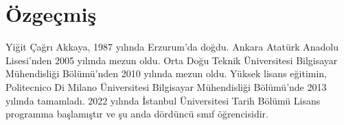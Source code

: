 \section*{Özgeçmiş}
Yiğit Çağrı Akkaya, 1987 yılında Erzurum'da doğdu. Ankara Atatürk Anadolu Lisesi'nden 2005 yılında mezun oldu. Orta Doğu Teknik Üniversitesi Bilgisayar Mühendisliği Bölümü'nden 2010 yılında mezun oldu.
Yüksek lisans eğitimin, Politecnico Di Milano Üniversitesi Bilgisayar Mühendisliği Bölümü'nde 2013 yılında tamamladı. 2022 yılında İstanbul Üniversitesi Tarih Bölümü Lisans programına başlamıştır ve şu 
anda dördüncü sınıf öğrencisidir.